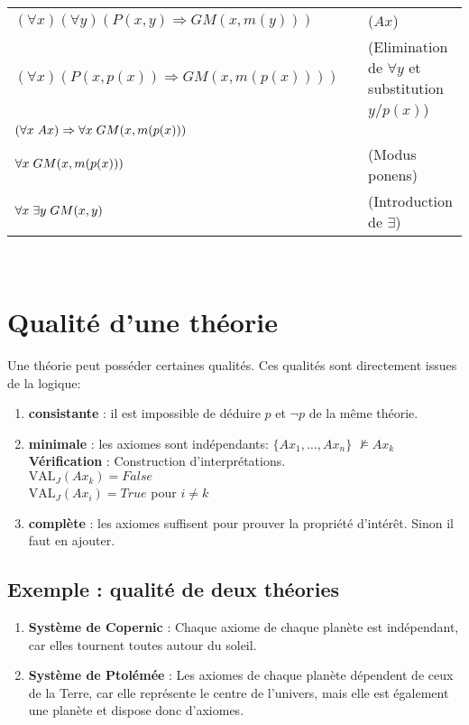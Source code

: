 \begin{tabular}{lll}
$(\forall x)(\forall y) \left(P(x,y)\Rightarrow GM(x, m(y)) \right)$&\hspace*{1cm}&($Ax$)\\
$(\forall x) \left(P(x,p(x))\Rightarrow GM(x, m(p(x))) \right)$&\hspace*{1cm}&(Elimination de $\forall y$ et substitution $y/p(x)$)\\
$\left( \forall x \hspace*{0.1cm} Ax \right)\Rightarrow \forall x \hspace*{0.1cm} GM(x,m(p(x)))$&\hspace*{1cm}&\\
$\forall x \hspace*{0.1cm} GM(x,m(p(x)))$&\hspace*{1cm}&(Modus ponens)\\
$\forall x \hspace*{0.1cm} \exists y \hspace*{0.1cm} GM(x,y)$&\hspace*{1cm}&(Introduction de $\exists$)\\
\end{tabular}\\

\section{Qualité d'une théorie}
Une théorie peut posséder certaines qualités. Ces qualités sont directement issues de la logique:
\begin {enumerate}
\item {\textbf{consistante}} : il est impossible de déduire \(p\) et \(\neg p\)  de la même théorie.
\item {\textbf{minimale}} : les axiomes sont indépendants: 
$\{Ax_1, \hdots, Ax_n\}$   $\nvDash Ax_k $\\
\textbf{Vérification} : Construction d'interprétations.\\
$\text{VAL}_J (Ax_k)= False$\\
$\text{VAL}_J (Ax_i)= True$  
pour $i \neq k$
\item {\textbf{complète}} : les axiomes suffisent pour prouver la propriété d'intérêt. Sinon il faut en ajouter.
\end {enumerate}
\subsection{Exemple : qualité de deux théories}
\begin {enumerate}
\item {\textbf{Système de Copernic}} : Chaque axiome de chaque planète est indépendant, car elles tournent toutes autour du soleil.
\item{\textbf{Système de Ptolémée}} : Les axiomes de chaque planète dépendent de ceux de la Terre, car elle représente le centre de l'univers, mais elle est également une planète et dispose donc d'axiomes.
\end {enumerate}
